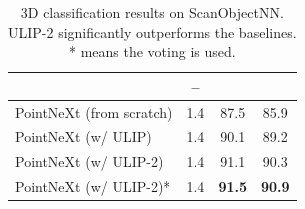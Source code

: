 \documentclass[10pt,twocolumn,letterpaper]{article}
\newcommand{\xmark}{\ding{55}}
\begin{document}
\begin{table}[htb]
{\begin{tabular}{lccc}
         & --\\
         \midrule
         PointNeXt (from scratch)  & 1.4 & 87.5 & 85.9 \\
         PointNeXt (w/ ULIP)  & 1.4 & 90.1 & 89.2 \\
         PointNeXt (w/ ULIP-2) & 1.4 & 91.1
         & 90.3
         \\
         PointNeXt (w/ ULIP-2)*  & 1.4 & \textbf{91.5} 
         & \textbf{90.9}
         \\
         \bottomrule
    \end{tabular}}
    \caption{3D classification results on ScanObjectNN. ULIP-2 significantly outperforms the baselines. * means the voting \cite{ma2022rethinking} is used.} 
    \label{tab:fintune-scan}
    \vspace{-4mm}
\end{table}
\end{document}
